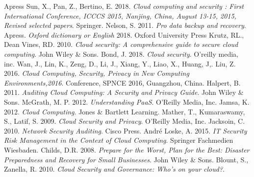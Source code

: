 \documentclass{article}
\begin{document}
\begin{thebibliography}{9}
        Apress
        Sun, X.,
        Pan, Z.,
        Bertino, E.
        2018.
	\textit{Cloud computing and security : First International Conference, ICCCS 2015, Nanjing, China, August 13-15, 2015, Revised selected papers}.
	Springer.
        Nelson, S.
        2011.
        \textit{Pro data backup and recovery}.
	Apress.
	\textit{Oxford dictionary or English}
	2018.
	Oxford University Press
        Krutz, RL.,
        Dean Vines, RD.
        2010.
        \textit{Cloud security: A comprehensive guide to secure cloud computing}.
	John Wiley \& Sons.
        Bond, J.
        2018.
        \textit{Cloud security}.
	O'reilly media, inc.
        Wan, J.,
        Lin, K.,
        Zeng, D.,
        Li, J.,
        Xiang, Y.,
        Liao, X.,
        Huang, J,.
        Liu, Z.
        2016.
        \textit{Cloud Computing, Security, Privacy in New Computing Environments,2016}.
	Conference, SPNCE 2016, Guangzhou, China.
        Halpert, B.
        2011.
	\textit{Auditing Cloud Computing: A Security and Privacy Guide}.
	John Wiley \& Sons.
        McGrath, M. P.
        2012.
	\textit{Understanding PaaS}.
        O'Reilly Media, Inc.
        Jamsa, K.
        2012.
        \textit{Cloud Computing}.
	Jones \& Bartlett Learning.
        Mather, T.,
        Kumaraswamy, S.,
        Latif, S.
        2009.
	\textit{Cloud Security and Privacy}.
        O'Reilly Media, Inc.
        Jacksoin, C.
        2010.
       	\textit{Network Security Auditing}.
	Cisco Press.
        André Loske, A.
        2015.
	\textit{IT Security Risk Management in the Context of Cloud Computing}.
        Springer Fachmedien Wiesbaden.
        Childs, D.R.
        2008.
        \textit{Prepare for the Worst, Plan for the Best: Disaster Preparedness and Recovery for Small Businesses}.
	John Wiley \& Sons.
        Blount, S.,
	Zanella, R.
        2010.
	\textit{Cloud Security and Governance: Who's on your cloud?}.

\end{thebibliography}
\end{document}
